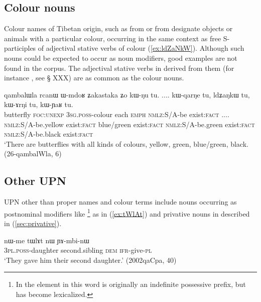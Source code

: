 \subsection{Colour nouns} \label{sec:tibetan.colours}
Colour names of Tibetan origin, such as  from  or  from  designate objects or animals with a particular colour, occurring in the same context as free S-participles of adjectival stative verbs of colour (\ref{ex:ldZaNkW}). Although such nouns could be expected to occur as noun modifiers, good examples are not found in the corpus. The adjectival stative verbs in  derived from them (for instance , see § XXX) are as common as the colour nouns.
 
\begin{exe}
\ex \label{ex:ldZaNkW}
 \gll qambalɯla rcanɯ ɯ-mdoʁ ʑakastaka ʑo kɯ-ŋu tu. .... kɯ-qarŋe tu, ldʑaŋkɯ tu, kɯ-ɤrŋi tu, kɯ-ɲaʁ tu. \\
 butterfly \textsc{foc}:\textsc{unexp} \textsc{3sg}.\textsc{poss}-colour each \textsc{emph} \textsc{nmlz}:S/A-be exist:\textsc{fact} .... \textsc{nmlz}:S/A-be.yellow exist:\textsc{fact} blue/green exist:\textsc{fact}  \textsc{nmlz}:S/A-be.green exist:\textsc{fact} \textsc{nmlz}:S/A-be.black exist:\textsc{fact}\\
 \glt `There are butterflies with all kinds of colours, yellow, green, blue/green, black. (26-qambalWla, 6)
\end{exe}

\subsection{Other UPN}   \label{sec:other.upn}
UPN other than proper names and colour terms include nouns occurring as postnominal modifiers like \footnote{In  the  element in this word is originally an indefinite possessive prefix, but has become lexicalized.} as in (\ref{ex:tWlAt}) and  privative nouns in  described in (\ref{sec:privative}). 

\begin{exe}
\ex \label{ex:tWlAt}
\gll  nɯ-me tɯlɤt nɯ ɲɤ-mbi-nɯ \\
\textsc{3pl.poss}-daughter second.sibling \textsc{dem} \textsc{ifr}-give-\textsc{pl} \\
\glt `They gave him their second daughter.' (2002qaCpa, 40)
\end{exe} 

